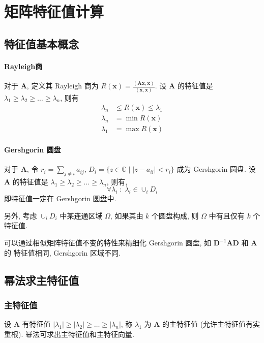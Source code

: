 \documentclass{ctexart}
\newcommand{\Cset}{\mathbb{C}}
\begin{document}
\section{矩阵特征值计算}
\subsection{特征值基本概念}
\paragraph{Rayleigh商}
    对于 $\mathbf{A}$, 定义其 Rayleigh 商为
    $R(\mathbf{x}) = \frac{(\mathbf{A} \mathbf{x} , \mathbf{x} )}{(\mathbf{x} ,\mathbf{x} )}$.
    设 $\mathbf{A}$ 的特征值是 $\lambda_1 \ge \lambda_2 \ge \ldots \ge \lambda_n$,
    则有 \begin{align*}
        \lambda_n &\le R(\mathbf{x} ) \le \lambda_1 \\
        \lambda_n &= \min R(\mathbf{x})\\
        \lambda_1 &= \max R(\mathbf{x})
    \end{align*}
\paragraph{Gershgorin 圆盘}
    对于 $\mathbf{A}$, 令 $r_i = \sum_{j \neq i} a_{ij}$,
    $D_i = \{z \in \Cset \;|\; |z - a_{ii}| < r_i\}$ 成为 Gershgorin 圆盘.
    设 $\mathbf{A}$ 的特征值是 $\lambda_1 \ge \lambda_2 \ge \ldots \ge \lambda_n$,
    则有, \[\forall \lambda_i\;:\; \lambda_i \in \cup_i D_i\]
    即特征值一定在 Gershgorin 圆盘中.\par
    另外, 考虑 $\cup_i D_i$ 中某连通区域 $\Omega$, 如果其由 $k$ 个圆盘构成,
    则 $\Omega$ 中有且仅有 $k$ 个特征值.\par
    可以通过相似矩阵特征值不变的特性来精细化 Gershgorin 圆盘,
    如 $ \mathbf{D}^{-1} \mathbf{A} \mathbf{D} $ 和 $\mathbf{A} $ 的 特征值相同,
    Gershgorin 区域不同.

\subsection{幂法求主特征值}
\subsubsection{主特征值}
    设 $\mathbf{A}$ 有特征值 $|\lambda_1| \ge |\lambda_2| \ge \ldots \ge |\lambda_n|$,
    称 $\lambda_1$ 为 $\mathbf{A}$ 的主特征值 (允许主特征值有实重根). 幂法可求出主特征值和主特征向量.
\end{document}
